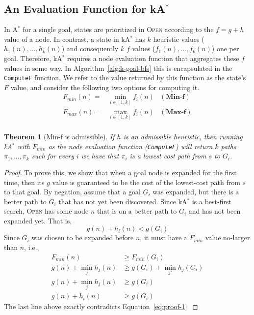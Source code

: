 \documentclass{aicom2e}
\newtheorem{theorem}{Theorem}
\newcommand{\astar}{A$^*$}
\newcommand{\kastar}{kA$^*$}
\newcommand{\minf}{Min-f}
\newcommand{\maxf}{Max-f}
\newcommand{\open}{\textsc{Open}}
\begin{document}
\subsection{An Evaluation Function for \kastar{}}
In \astar{} for a single goal, states are prioritized in \open{} according to the $f=g+h$ value of a node. 
In contrast, a state in \kastar{} has $k$ heuristic values ($h_1(n),\ldots,h_k(n)$) and 
consequently $k$ $f$ values ($f_1(n),\ldots,f_k(n)$) one per goal. Therefore, \kastar{} requires a node evaluation function that aggregates these $f$ values in some way. In Algorithm~\ref{alg:k-goal-bfs} this is encapsulated in the {\tt ComputeF} function. We refer to the value returned by this function as the state's $F$ value, and consider the following two options for computing it. 
\begin{align}
F_{min}(n)=&\min_{i\in [1,k]}f_i(n) & (\textbf{\minf})\\ 
F_{max}(n)=&\max_{i\in [1,k]}f_i(n) & (\textbf{\maxf})\\ 
\end{align}



\begin{theorem}[\minf{} is admissible]
If $h$ is an admissible heuristic, then running \kastar{} with $F_{min}$ 
as the node evaluation function ({\tt ComputeF}) will return $k$ paths $\pi_1,\ldots, \pi_k$ such for every $i$ we have that $\pi_i$ is a lowest cost path from $s$ to $G_i$. 
\label{the:min-f}
\end{theorem}
 \begin{proof}
To prove this, we show that when a goal node is expanded for the first time, then its $g$ value is guaranteed to 
be the cost of the lowest-cost path from $s$ to that goal. 
By negation, assume that a goal $G_i$ was expanded, but there is a better path to $G_i$
that has not yet been discovered. Since \kastar{} is a best-first search, \open{} has some node $n$ that is on a better path to $G_i$ and has not been expanded yet. 
That is, 
\begin{equation}
g(n)+h_i(n)<g(G_i)
\label{eq:proof-1}
\end{equation}
Since $G_i$ was chosen to be expanded before $n$, it must have a $F_{min}$ value no-larger than $n$, i.e.,
\begin{align}
F_{min}(n) &\geq  F_{min}(G_i)\\
g(n)+\min_j h_j(n)& \geq  g(G_i)+\min_{j'} h_j(G_i)\\
g(n)+\min_j h_j(n)& \geq  g(G_i)\\
g(n)+h_i(n) &\geq  g(G_i) 
\end{align}
The last line above exactly contradicts Equation~\ref{eq:proof-1}. 
\end{proof}
\end{document}

